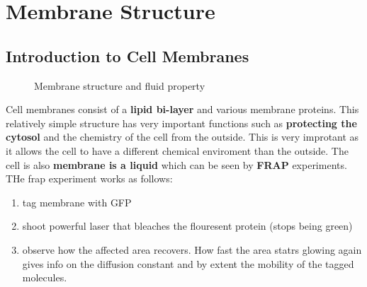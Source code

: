 \documentclass[../main.tex]{subfiles}
\begin{document}
    \section{Membrane Structure}

        \subsection{Introduction to Cell Membranes}
            
        \begin{figure}[H]
            \centering
            \hspace{0.05\textwidth} %
            \caption{Membrane structure and fluid property}
            \label{fig:ITC_all}
        \end{figure}

        Cell membranes consist of a \textbf{lipid bi-layer} and various membrane proteins. This relatively simple structure has very important functions such as \textbf{protecting the cytosol} and the chemistry of the cell from the outside. This is very improtant as it allows the cell to have a different chemical enviroment than the outside. The cell is also  \textbf{membrane is a liquid }which can be seen by \textbf{\gls{FRAP}} experiments. THe frap experiment works as follows:
        \begin{enumerate}
            \item tag membrane with GFP
            \item shoot powerful laser that bleaches the flouresent protein (stops being green)
            \item observe how the affected area recovers. How fast the area statrs glowing again gives info on the diffusion constant and by extent the mobility of the tagged molecules.
        \end{enumerate}
\end{document}
